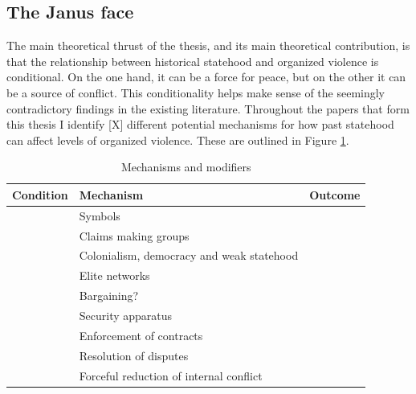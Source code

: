 
\subsection{The Janus face}
\label{Janus}


The main theoretical thrust of the thesis, and its main theoretical
contribution, is that the relationship between historical statehood and
organized violence is conditional. On the one hand, it can be a force for peace,
but on the other it can be a source of conflict. This conditionality helps make
sense of the seemingly contradictory findings in the existing literature.
Throughout the papers that form this thesis I identify [X] different potential
mechanisms for how past statehood can affect levels of organized violence. These
are outlined in Figure \ref{Mechanisms and modifiers}.

\begin{table}
	\begin{tabularx}{\textwidth}{>{\centering\arraybackslash}X>{\centering\arraybackslash}X>{\centering\arraybackslash}X}
	\textbf{Condition} & \textbf{Mechanism} & \textbf{Outcome} \\
\toprule
	\multirow{4}{=}{\centering{Number and far from capital}} & Symbols & \multirow{4}{=}{\centering{Conflict}} \\
    	\cmidrule{2-2}
	& Claims making groups & \\
    	\cmidrule{2-2}
	& Colonialism, democracy and weak statehood & \\
	\cmidrule{2-2}
	& Elite networks & \\
\midrule
	\multirow{2}{=}{\centering{Near to capital}} &  Bargaining? & \multirow{5}{=}{\centering{Peace}} \\
	\cmidrule{2-2}
	& Security apparatus & \\
		\cmidrule{1-2}
	\multirow{3}{=}{\centering{Type of violence}} & Enforcement of contracts & \\
		\cmidrule{2-2}
	& Resolution of disputes  & \\
		\cmidrule{2-2}
	& Forceful reduction of internal conflict & \\
	\bottomrule
\end{tabularx}
\caption{Mechanisms and modifiers}
\label{Mechanisms and modifiers}
\end{table}

